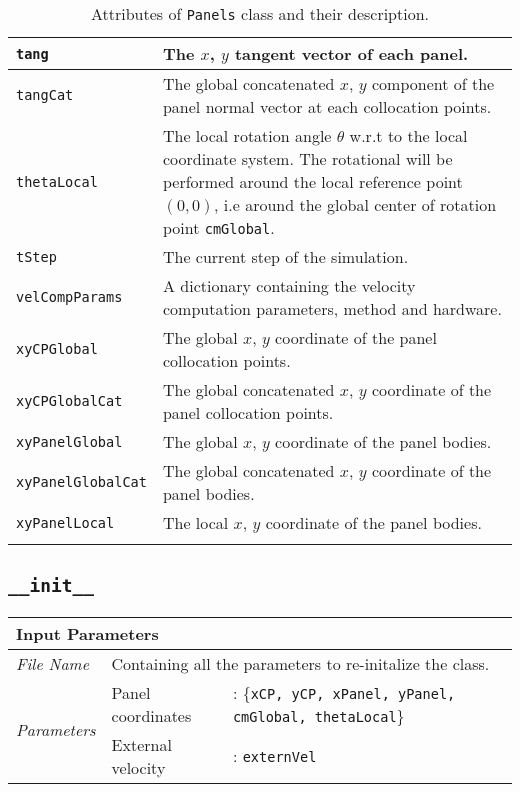 \begin{longtable}{|l|p{12cm}|}
	\texttt{tang} & The $x$, $y$ tangent vector of each panel.\\          \hline
	\texttt{tangCat} & The global concatenated $x$, $y$ component of the panel
	                  normal vector at each collocation points.\\          \hline
	\texttt{thetaLocal} & The local rotation angle $\theta$ w.r.t to the local
	                     coordinate system. The rotational will be performed around
	                     the local reference point $(0,0)$, i.e around the global center of rotation point \texttt{cmGlobal}.\\          \hline
	\texttt{tStep} & The current step of the simulation.\\          \hline
	\texttt{velCompParams} & A dictionary containing the velocity computation parameters, method and hardware.\\          \hline
	\texttt{xyCPGlobal} & The global $x$, $y$ coordinate of the panel collocation
	                     points.\\ \hline
	\texttt{xyCPGlobalCat} & The global concatenated $x$, $y$ coordinate of the
	                        panel collocation points.\\          \hline
	\texttt{xyPanelGlobal} & The global $x$, $y$ coordinate of the panel bodies.\\          \hline
	\texttt{xyPanelGlobalCat} & The global concatenated $x$, $y$ coordinate of the
	                           panel bodies.\\          \hline
	\texttt{xyPanelLocal} & The local $x$, $y$ coordinate of the panel bodies.\\          \hline
                       
    \caption{Attributes of \texttt{Panels} class and their description.}
    \label{tab:attributesPanels}
\end{longtable}
\endgroup


\subsection*{\texttt{\_\_init\_\_}}
	\begin{tabular}{l|lp{7cm}}
		\multicolumn{2}{l}{\textbf{Input Parameters}} & \\ \hline
		\textit{File Name} & \multicolumn{2}{l}{Containing all the parameters to re-initalize the class.} \\ \hline
		\multirow{2}{*}{\textit{Parameters}} & Panel coordinates &: \{\texttt{xCP, yCP, xPanel, yPanel, cmGlobal, thetaLocal}\}\\ \cline{2-3}
		& External velocity &: \texttt{externVel} \\ \cline{2-3}
	\end{tabular}

